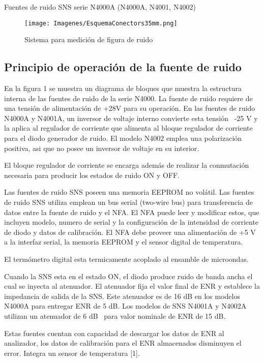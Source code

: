 \documentclass{article}
\title{}
\begin{document}
Fuentes de ruido SNS serie N4000A (N4000A, N4001, N4002)

	\begin{figure}[h!]
		\centering
		\begin{minipage}{18.516cm}
			\texttt{[image: Imagenes/EsquemaConectors35mm.png]}
		\end{minipage}
		\caption{Sistema para medición de figura de ruido}
		\label{Fig:EsquemaSistemaMedicion}
	\end{figure}

\subsection{Principio de operación de la fuente de ruido}
En la figura 1 se muestra un diagrama de bloques que muestra la estructura interna de las fuentes de ruido de la serie N4000. La fuente de ruido requiere de una tensión de alimentación de +28V para su operación. En las fuentes de ruido N4000A y N4001A, un inversor de voltaje interno convierte esta tensión \ {}-25 V y la aplica al regulador de corriente que alimenta al bloque regulador de corriente para el diodo generador de ruido. El modelo N4002 emplea una polarización positiva, asi que no posee un inversor de voltaje en su interior.

El bloque regulador de corriente se encarga además de realizar la conmutación necesaria para producir los estados de ruido ON y OFF.

Las fuentes de ruido SNS poseen una memoria EEPROM no volátil. Las fuentes de ruido SNS utiliza emplean un bus serial (two-wire bus) para transferencia de datos entre la fuente de ruido y el NFA. El NFA puede leer y modificar estos, que incluyen modelo, numero de serial y la configuración de la intensidad de corriente de diodo y datos de calibración. El NFA debe proveer una alimentación de +5 V a la interfaz serial, la memoria EEPROM y el sensor digital de temperatura.

El termómetro digital esta termicamente acoplado al ensamble de microondas.

Cuando la SNS esta en el estado ON, el diodo produce ruido de banda ancha el cual se inyecta al atenuador. El atenuador fija el valor final de ENR y establece la impedancia de salida de la SNS. Este atenuador es de 16 dB en los modelos N4000A para entregar ENR de 5 dB. Los modelos de SNS N4001A y N4002A utilizan un atenuador de 6 dB \ para valor nominale de ENR de 15 dB.

Estas fuentes cuentan con capacidad de descargar los datos de ENR al analizador, los datos de calibración para el ENR almacenados disminuyen el error. Integra un sensor de temperatura [1].
\end{document}
